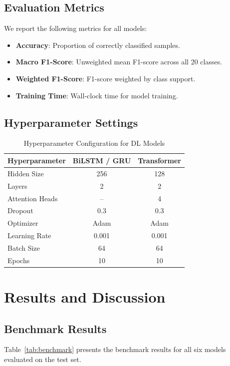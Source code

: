 \documentclass{article}
\begin{document}
\subsection{Evaluation Metrics}

We report the following metrics for all models:
\begin{itemize}
\item \textbf{Accuracy}: Proportion of correctly classified samples.
\item \textbf{Macro F1-Score}: Unweighted mean F1-score across all 20 classes.
\item \textbf{Weighted F1-Score}: F1-score weighted by class support.
\item \textbf{Training Time}: Wall-clock time for model training.
\end{itemize}

\subsection{Hyperparameter Settings}

\begin{table}[H]
\centering
\caption{Hyperparameter Configuration for DL Models}
\begin{tabular}{lcc}
\toprule
\textbf{Hyperparameter} & \textbf{BiLSTM / GRU} & \textbf{Transformer} \\
\midrule
Hidden Size & 256 & 128 \\
Layers & 2 & 2 \\
Attention Heads & -- & 4 \\
Dropout & 0.3 & 0.3 \\
Optimizer & Adam & Adam \\
Learning Rate & 0.001 & 0.001 \\
Batch Size & 64 & 64 \\
Epochs & 10 & 10 \\
\bottomrule
\end{tabular}
\end{table}

\section{Results and Discussion}

\subsection{Benchmark Results}

Table~\ref{tab:benchmark} presents the benchmark results for all six models evaluated on the test set.
\end{document}
